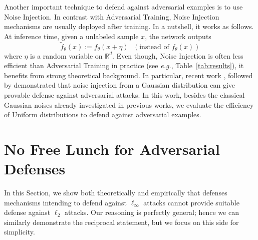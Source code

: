 Another important technique to defend against adversarial examples is to use Noise Injection. 
In contrast with Adversarial Training, Noise Injection mechanisms are usually deployed after training. In a nutshell, it works as follows. At inference time, given a unlabeled sample $x$, the network outputs
\begin{equation}
    \tilde{f}_\theta (x):= f_\theta(x + \eta) \ \ \ (\text{instead of  }f_\theta(x)) 
\end{equation}
where $\eta$ is a random variable on $\mathbb{R}^d$.
Even though, Noise Injection is often less efficient than Adversarial Training in practice (see \emph{e.g.}, Table~\ref{tab:results}), it benefits from strong theoretical background. In particular, recent work \cite{lecuyer2018certified}, followed by \cite{KolterRandomizedSmoothing,pinot2019theoretical} demonstrated that noise injection from a Gaussian distribution can give provable defense against \ltwo adversarial attacks. In this work, besides the classical Gaussian noises already investigated in previous works, we evaluate the efficiency of Uniform distributions to defend against \ltwo adversarial examples. 


\section{No Free Lunch for Adversarial Defenses}
\label{sec:no_free_lunch}

In this Section, we show both theoretically and empirically that defenses mechanisms intending to defend against $\ell_\infty$ attacks cannot provide suitable defense against $\ell_2$ attacks. Our reasoning is perfectly general; hence we can similarly demonstrate the reciprocal statement, but we focus on this side for simplicity. 


